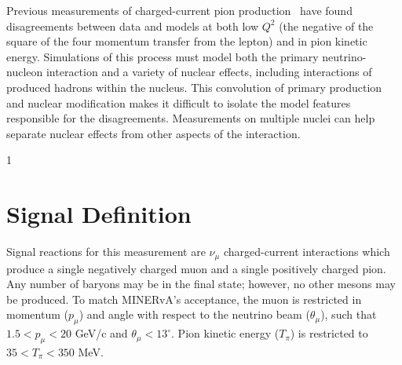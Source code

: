 \documentclass[aps,preprint,showpacs,superscriptaddress,letterpaper,showkeys,superscriptaddress,nofootinbib,floatfix]{revtex4-1}
\newcommand{\minerva}{MINERvA}
\newcommand{\firstReviewAdd}[1]{{\bf\color{blue} \protect #1}}
\newcommand{\firstReviewStrike}[1]{{\bf\color{blue}\protect \sout{#1}}}
\newcommand{\secondReviewAdd}[1]{{\bf\color{purple} \protect #1}}
\newcommand{\secondReviewStrike}[1]{{\bf\color{purple}\protect \sout{#1}}}
\newcommand{\firstRefereeAdd}[1]{{\bf\color{green} \protect #1}}
\newcommand{\firstRefereeStrike}[1]{{\bf\color{green}\protect \sout{#1}}}
\newcommand{\showSections}[0]{0}
\renewcommand{\firstReviewAdd}[1]{\protect #1}
\renewcommand{\firstReviewStrike}[1]{}
\renewcommand{\secondReviewAdd}[1]{\protect #1}
\renewcommand{\secondReviewStrike}[1]{}
\renewcommand{\firstRefereeAdd}[1]{\protect #1}
\renewcommand{\firstRefereeStrike}[1]{}
\begin{document}
Previous measurements of charged-current pion production~\cite{AguilarArevalo:2010bm,Adamson:2014pgc, Eberly:2014mra,Aliaga:2015wva,McGivern:2016bwh,Altinok:2017xua} have found disagreements between data and models \firstRefereeStrike{in the event rate} at both low $Q^2$ (the negative of the square of the four momentum
transfer from the lepton) and in pion kinetic energy.  Simulations of this process must model both the primary neutrino-nucleon interaction \firstRefereeStrike{as well as}\firstRefereeAdd{and} a variety of nuclear effects, including \firstReviewStrike{additional} interactions of produced hadrons within the nucleus. This convolution of primary production and nuclear modification makes it difficult to isolate the \firstRefereeAdd{model} features \firstRefereeStrike{of these models that are }responsible for the disagreements\firstRefereeStrike{ with data}.  Measurements on multiple nuclei can help \firstRefereeStrike{untangle}\firstRefereeAdd{separate} nuclear effects from other aspects of the interaction. 
\firstReviewStrike{
In this letter, the MINERvA collaboration presents the first simultaneous measurement of charged-current pion production on many nuclear targets -- scintillator, carbon, water, iron, and lead.  We also present \firstReviewAdd{cross section} ratios of each of the latter targets to scintillator, where many systematic uncertainties cancel, allowing a precise measurement of the nuclear dependence.  }

\if\showSections1 \section{Signal Definition} \fi

Signal reactions for this \firstReviewStrike{result} \firstReviewAdd{measurement} are $\nu_\mu$ charged-current interactions which produce a single negatively charged muon and a single positively charged pion. Any number of baryons may be \secondReviewStrike{ejected from the nucleus}\secondReviewAdd{in the final state}; however, no other mesons may be produced.  \firstRefereeStrike{In order to ensure high reconstruction efficiency} \firstRefereeAdd{To match \minerva's acceptance}, the muon is restricted in momentum ($p_\mu$) and angle with respect to the neutrino beam ($\theta_\mu$), such that $1.5<p_\mu<20$ GeV/c and $\theta_\mu<13^\circ$\firstRefereeAdd{.}\firstRefereeStrike{, while the p}\firstRefereeAdd{  P}ion\firstRefereeStrike{s must have} kinetic energy ($T_\pi$) \firstRefereeStrike{such that}\firstRefereeAdd{is restricted to} $35<T_\pi< 350$ MeV.  
\end{document}
